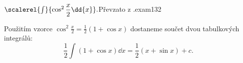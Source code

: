 \begin{mathexam}{\(\protect\scalerel{\int}{\cos^2\dfrac{x}{2}\dd{x}}.\)\hfill Převzato z
  \cite[s.~30]{Knichal}.}{exam132} 
  
  Použitím vzorce \(\cos^2\frac{x}{2} = \frac{1}{2}(1+\cos x)\) dostaneme součet dvou tabulkových
  integrálů:
  \begin{equation*}
    \frac{1}{2}\int{(1+\cos x)}\dd{x} = \frac{1}{2}(x+\sin x) + c.
  \end{equation*}
\end{mathexam}